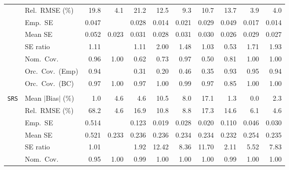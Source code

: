 \begin{landscape}
\begin{longtable}{llrrrrrrrrr}
 & Rel.\ RMSE (\%) & 19.8 & \cellcolor{rankthree}4.1 & 21.2 & 12.5 & 9.3 & 10.7 & 13.7 & \cellcolor{rankone}3.9 & \cellcolor{ranktwo}4.0 \\
 & Emp.\ SE & 0.047 &  & 0.028 & 0.014 & 0.021 & 0.029 & 0.049 & 0.017 & 0.014 \\
 & Mean SE & 0.052 & 0.023 & 0.031 & 0.028 & 0.031 & 0.030 & 0.026 & 0.029 & 0.027 \\
 & SE ratio & \cellcolor{ranktwo}1.11 &  & \cellcolor{ranktwo}1.11 & 2.00 & 1.48 & \cellcolor{rankone}1.03 & \cellcolor{rankthree}0.53 & 1.71 & 1.93 \\
 & Nom.\ Cov. & \cellcolor{rankone}0.96 & \cellcolor{rankthree}1.00 & 0.62 & 0.73 & \cellcolor{ranktwo}0.97 & 0.50 & 0.81 & \cellcolor{rankthree}1.00 & \cellcolor{rankthree}1.00 \\
 & Orc.\ Cov.\ (Emp) & \cellcolor{ranktwo}0.94 &  & 0.31 & 0.20 & 0.46 & 0.35 & \cellcolor{rankthree}0.93 & \cellcolor{rankone}0.95 & \cellcolor{ranktwo}0.94 \\
 & Orc.\ Cov.\ (BC) & \cellcolor{rankone}0.97 & \cellcolor{rankthree}1.00 & \cellcolor{rankone}0.97 & \cellcolor{rankthree}1.00 & \cellcolor{ranktwo}0.99 & \cellcolor{rankone}0.97 & 0.85 & \cellcolor{rankthree}1.00 & \cellcolor{rankthree}1.00 \\
\addlinespace[2pt]
\multicolumn{11}{l}{\textbf{Binary \& Categorical Phase-One Covariates}} \\
\addlinespace[2pt]
\quad \texttt{SRS} & Mean $|$Bias$|$ (\%) & \cellcolor{ranktwo}1.0 & 4.6 & 4.6 & 10.5 & 8.0 & 17.1 & \cellcolor{rankthree}1.3 & \cellcolor{rankone}0.0 & 2.3 \\
 & Rel.\ RMSE (\%) & 68.2 & \cellcolor{rankone}4.6 & 16.9 & 10.8 & \cellcolor{rankthree}8.8 & 17.3 & 14.6 & \cellcolor{ranktwo}6.1 & \cellcolor{rankone}4.6 \\
 & Emp.\ SE & 0.514 &  & 0.123 & 0.019 & 0.028 & 0.020 & 0.110 & 0.046 & 0.030 \\
 & Mean SE & 0.521 & 0.233 & 0.236 & 0.236 & 0.234 & 0.234 & 0.232 & 0.254 & 0.235 \\
 & SE ratio & \cellcolor{rankone}1.01 &  & \cellcolor{ranktwo}1.92 & 12.42 & 8.36 & 11.70 & \cellcolor{rankthree}2.11 & 5.52 & 7.83 \\
 & Nom.\ Cov. & \cellcolor{rankone}0.95 & \cellcolor{rankthree}1.00 & \cellcolor{ranktwo}0.99 & \cellcolor{rankthree}1.00 & \cellcolor{rankthree}1.00 & \cellcolor{rankthree}1.00 & \cellcolor{ranktwo}0.99 & \cellcolor{rankthree}1.00 & \cellcolor{rankthree}1.00 \\

\end{longtable}
\end{landscape}
